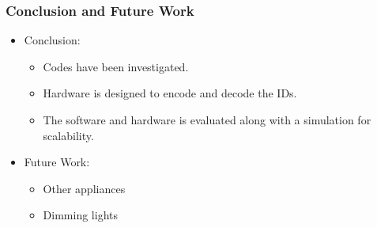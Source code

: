 \documentclass{beamer}
\begin{document}
	\begin{frame}\frametitle{Conclusion and Future Work}

		\begin{itemize}
			\item Conclusion:
				\begin{itemize}

					\item Codes have been investigated.

					\item Hardware is designed to encode and decode the IDs.

					\item The software and hardware is evaluated along with a simulation for scalability.

				\end{itemize}

			\item Future Work:
				\begin{itemize}

					\item Other appliances

					\item Dimming lights

				\end{itemize}
		\end{itemize}

		
		
		

	\end{frame}
\end{document}
